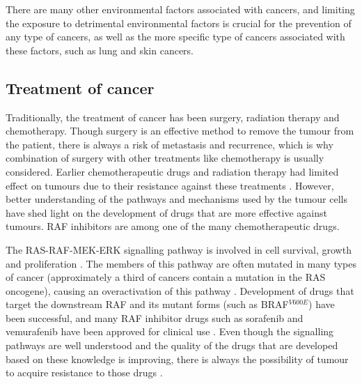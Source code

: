 There are many other environmental factors associated with cancers, and limiting the exposure to detrimental environmental factors is crucial for the prevention of any type of cancers, as well as the more specific type of cancers associated with these factors, such as lung and skin cancers.

\subsection{Treatment of cancer}
\label{sub:treatment_of_cancer}

Traditionally, the treatment of cancer has been surgery, radiation therapy and chemotherapy.
Though surgery is an effective method to remove the tumour from the patient, there is always a risk of metastasis and recurrence, which is why combination of surgery with other treatments like chemotherapy is usually considered.
Earlier chemotherapeutic drugs and radiation therapy had limited effect on tumours due to their resistance against these treatments \citep{Wilhelm2006}.
However, better understanding of the pathways and mechanisms used by the tumour cells have shed  light on the development of drugs that are more effective against tumours.
RAF inhibitors are among one of the many chemotherapeutic drugs.

The RAS-RAF-MEK-ERK signalling pathway is  involved in cell survival, growth and proliferation \citep{Samatar2014,Wilhelm2006}.
The members of this pathway are often mutated in many types of cancer (approximately a third of cancers contain a mutation in the RAS oncogene), causing an overactivation of this pathway \citep{Samatar2014}.
Development of drugs that target  the downstream RAF and its mutant forms (such as BRAF$^{V600E}$) have been successful, and many RAF inhibitor drugs such as sorafenib and vemurafenib have been approved for clinical use \citep{Samatar2014,Wilhelm2006}.
Even though the signalling pathways are well understood and the quality of the drugs that are developed based on these knowledge is improving, there is always the possibility of tumour to acquire resistance to those drugs \citep{Samatar2014}.

